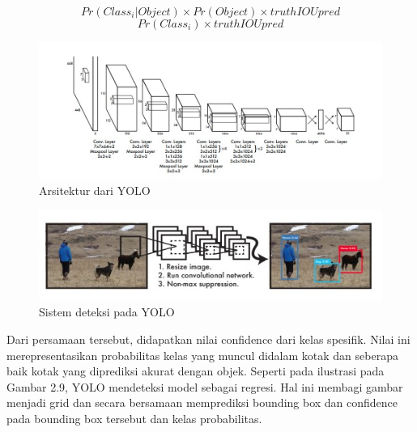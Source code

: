 \begin{equation}
  Pr(Class_i | Object) \times Pr(Object) \times truthIOUpred
\end{equation}
\begin{equation}
  Pr(Class_i)\times truthIOUpred
\end{equation}
\begin{figure}[ht]
  \centering
  \includegraphics[scale=0.6]{gambar/arch_yolo.jpg}
  \caption{Arsitektur dari YOLO}
  \label{fig:arch-yolo}
\end{figure}
\begin{figure}[ht]
  \centering
  \includegraphics[scale=0.8]{gambar/sistem-deteksi-yolo.jpg}
  \caption{Sistem deteksi pada YOLO}
  \label{fig:sistem-deteksi-yolo}
\end{figure}

Dari persamaan tersebut, didapatkan nilai confidence dari kelas spesifik. Nilai ini merepresentasikan probabilitas kelas yang muncul didalam kotak dan seberapa baik kotak yang diprediksi akurat dengan
objek. Seperti pada ilustrasi pada Gambar 2.9, YOLO mendeteksi
model sebagai regresi. Hal ini membagi gambar menjadi grid dan
secara bersamaan memprediksi bounding box dan confidence pada
bounding box tersebut dan kelas probabilitas.

